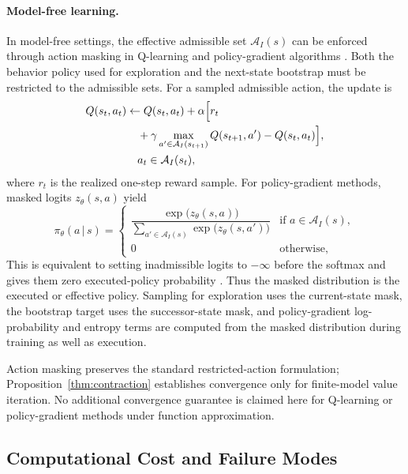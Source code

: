 \documentclass[journal]{IEEEtran}
\theoremstyle{definition}
\newcommand{\cA}{\mathcal{A}}
\newcommand{\given}{\,\vert\,}
\begin{document}
\paragraph{Model-free learning.}
In model-free settings, the effective admissible set $\cA_I(s)$ can be enforced
through action masking in Q-learning and policy-gradient algorithms
\citep{huang2022,lin2021actionconstrained}.
Both the behavior policy used for exploration and
the next-state bootstrap must be restricted to the admissible sets. For a
sampled admissible action, the update is
\begin{equation}
\begin{aligned}
  Q(s_t,a_t) &\leftarrow Q(s_t,a_t) + \alpha\Bigl[r_t \\
    &\quad + \gamma \max_{a' \in \cA_I(s_{t+1})} Q(s_{t+1},a')
    - Q(s_t,a_t)\Bigr], \\
  &\quad a_t \in \cA_I(s_t),
\end{aligned}
\end{equation}
where $r_t$ is the realized one-step reward sample. For policy-gradient
methods, masked logits $z_\theta(s,a)$ yield
\begin{equation}
  \pi_\theta(a \given s) =
  \begin{cases}
    \dfrac{\exp\bigl(z_\theta(s,a)\bigr)}
          {\displaystyle\sum_{a' \in \cA_I(s)} \exp\bigl(z_\theta(s,a')\bigr)}
    & \text{if } a \in \cA_I(s), \\[8pt]
    0 & \text{otherwise,}
  \end{cases}
  \label{eq:masked_policy}
\end{equation}
This is equivalent to setting inadmissible logits to $-\infty$ before the
softmax and gives them zero executed-policy probability \citep{huang2022}. Thus the
masked distribution is the executed or effective policy. Sampling for
exploration uses the current-state mask, the bootstrap target uses the
successor-state mask, and policy-gradient log-probability and entropy terms are
computed from the masked distribution during training as well as execution.

Action masking preserves the standard restricted-action formulation;
Proposition~\ref{thm:contraction} establishes convergence only for finite-model
value iteration. No additional convergence guarantee is claimed here for
Q-learning or policy-gradient methods under function approximation.

\subsection{Computational Cost and Failure Modes}
\label{subsec:analysis}
\end{document}
